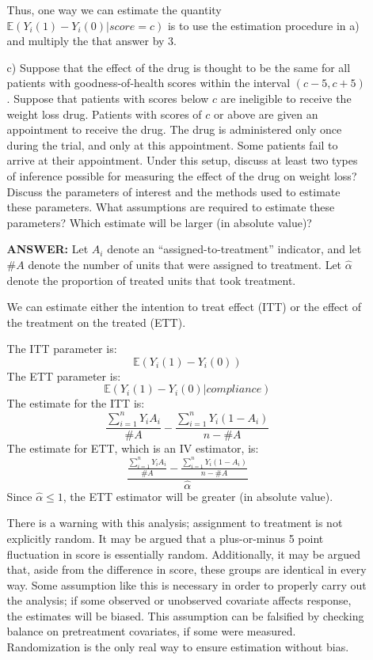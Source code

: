 \documentclass{article}
\newcommand{\E}[0]{\mathbb{E}}
\begin{document}
\begin{itemize}
\begin{itemize}
           Thus, one way we can estimate the quantity $\E(Y_i(1) - Y_i(0)| score = c)$
           is to use the estimation procedure in a) and multiply the that answer by 3.
        \item[c)]
          Suppose that the effect of the drug is thought to be the same
          for all patients with goodness-of-health scores within the interval
          $(c-5,c+5)$.
          Suppose that patients with scores below $c$ 
          are ineligible to receive the weight loss drug.
          Patients with scores of $c$ or above are given an appointment to receive 
          the drug.
          The drug is administered only once during the trial, and only at this appointment.
          Some patients fail to arrive at their appointment.
          Under this setup,
          discuss at least two types of inference 
          possible for measuring the effect of the drug on weight loss? 
          Discuss the parameters of interest and the methods used to estimate these parameters.
          What assumptions are required to estimate these parameters?
          Which estimate will be larger (in absolute value)?
          
          \textbf{ANSWER:}
          Let $A_i$ denote an ``assigned-to-treatment'' indicator,
          and let $\#A$ denote the number of units that were assigned to treatment.
          Let $\hat\alpha$ denote the proportion of treated units that took treatment.
          
          We can estimate either the intention to treat effect (ITT) or the 
          effect of the treatment on the treated (ETT).
          
          The ITT parameter is:
          $$
            \E(Y_i(1) - Y_i(0))
          $$
          The ETT parameter is:
          $$
            \E(Y_i(1) - Y_i(0)|compliance)
          $$
          The estimate for the ITT is:
          $$
            \frac{\sum_{i=1}^n Y_iA_i}{\#A} -   \frac{\sum_{i=1}^n Y_i(1-A_i)}{n-\#A} 
          $$
          The estimate for ETT, which is an IV estimator, is:
          $$
            \frac{\frac{\sum_{i=1}^n Y_iA_i}{\#A} -   \frac{\sum_{i=1}^n Y_i(1-A_i)}{n-\#A}}{\hat\alpha}
          $$
          Since $\hat\alpha \leq 1$, the ETT estimator will be greater (in absolute value).
          
          There is a warning with this analysis; assignment to treatment is not explicitly random.
          It may be argued that a plus-or-minus 5 point fluctuation in score is essentially random.
          Additionally, it may be argued that, aside from the difference in score, these groups
          are identical in every way.
          Some assumption like this is necessary in order to properly carry out the analysis;
          if some observed or unobserved covariate affects response, the estimates will be biased.
          This assumption can be falsified by checking balance on pretreatment covariates, if some
          were measured.
          Randomization is the only real way to ensure estimation without bias.
          

\end{itemize}
\end{itemize}
\end{document}

